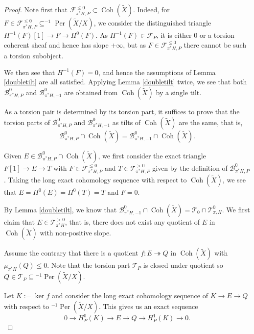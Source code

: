 \documentclass[10pt,a4paper]{amsart}
\DeclareMathOperator{\Coh}{Coh}
\DeclareMathOperator{\Per}{Per}
\begin{document}
\begin{proof}
Note first that $\mathcal{F}^{\leq 0}_{\pi^\ast H,P} \subset \Coh(\widetilde{X})$.
Indeed, for $F \in \mathcal{F}^{\leq 0}_{\pi^\ast H,P} \subseteq ^{-1}\Per(\widetilde{X}/X)$, 
we consider the distinguished triangle $H^{-1}(F)[1] \longrightarrow F \longrightarrow H^0(F)$.
As $H^{-1}(F) \in \mathcal{F}_P$, it is either $0$ or a torsion coherent sheaf and hence has slope $+\infty$, but as $F \in \mathcal{F}^{\leq 0}_{\pi^\ast H,P}$ there cannot be such a torsion subobject.

We then see that $H^{-1}(F) = 0$, and hence the assumptions of Lemma \ref{doubletilt} are all satisfied.
Applying Lemma \ref{doubletilt} twice, we see that both $\mathcal{B}^0_{\pi^\ast H,P}$ and $\mathcal{B}^0_{\pi^\ast H,-1}$ are obtained from $\Coh(\widetilde{X})$ by a single tilt. 

As a torsion pair is determined by its torsion part,
it suffices to prove that the torsion parts of $\mathcal{B}^0_{\pi^\ast H,P}$ and $\mathcal{B}^0_{\pi^\ast H,-1}$ as tilts of $\Coh(\widetilde{X})$ are the same, that is, 
\[\mathcal{B}^0_{\pi^\ast H,P} \cap \Coh(\widetilde{X}) = \mathcal{B}^0_{\pi^\ast H,-1} \cap \Coh(\widetilde{X}).\]


Given $E \in \mathcal{B}^0_{\pi^\ast H,P} \cap \Coh(\widetilde{X})$, we first consider the exact triangle $F[1] \longrightarrow E \longrightarrow T$ with $F \in \mathcal{F}^{\leq 0}_{\pi^\ast H,P}$ and $T \in \mathcal{T}^{>0}_{\pi^\ast H,P}$ given by the definition of $\mathcal{B}^0_{\pi^\ast H,P}$. 
Taking the long exact cohomology sequence with respect to $\Coh(\widetilde{X})$,
we see that $E = H^0(E) = H^0(T)=T$  and $F=0$.

By Lemma \ref{doubletilt}, we know that $\mathcal{B}^0_{\pi^\ast H,-1} \cap \Coh(\widetilde{X}) = \mathcal{T}_0 \cap \mathcal{T}^0_{\pi_\ast H}$.
We first claim that $E \in \mathcal{T}^{>0}_{\pi^\ast H}$, that is, there does not exist any quotient of $E$ in $\Coh(\widetilde{X})$ with non-positive slope.

Assume the contrary that there is a quotient $f \colon E \twoheadrightarrow Q$ in $\Coh(\widetilde{X})$ with $\mu_{\pi^\ast H}(Q) \leq 0$.
Note that the torsion part $\mathcal{T}_P$ is closed under quotient so $Q \in \mathcal{T}_P \subseteq {^{-1}\Per(\widetilde{X}/X)}$.

Let $K:= \ker f$ and consider the long exact cohomology sequence of $K \longrightarrow E \longrightarrow Q$ with respect to $^{-1}\Per(\widetilde{X}/X)$.
This gives us an exact sequence
$$ 0 \longrightarrow H^0_P(K) \longrightarrow E \longrightarrow Q
\longrightarrow H^1_P(K)
\longrightarrow 0. $$


\end{proof}
\end{document}
